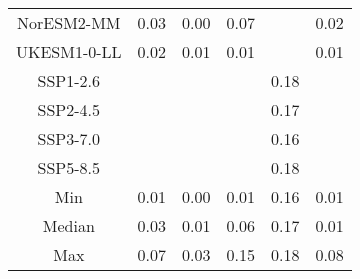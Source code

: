 \begin{table*}[t]
\begin{tabular}{c|rrr|rr}
NorESM2-MM & 0.03 & 0.00 & 0.07 &  & 0.02 \\
UKESM1-0-LL & 0.02 & 0.01 & 0.01 &  & 0.01 \\
SSP1-2.6 &  &  &  & 0.18 &  \\
SSP2-4.5 &  &  &  & 0.17 &  \\
SSP3-7.0 &  &  &  & 0.16 &  \\
SSP5-8.5 &  &  &  & 0.18 &  \\
\midrule
Min & 0.01 & 0.00 & 0.01 & 0.16 & 0.01 \\
Median & 0.03 & 0.01 & 0.06 & 0.17 & 0.01 \\
Max & 0.07 & 0.03 & 0.15 & 0.18 & 0.08 \\
\bottomrule
\end{tabular}
\end{table*}
